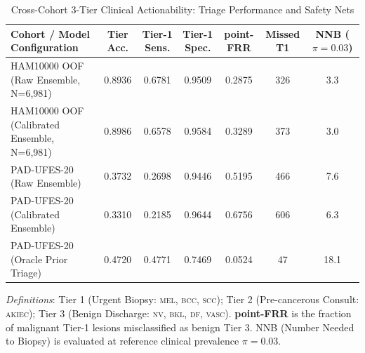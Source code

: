 \begin{table}[t]
\caption{Cross-Cohort 3-Tier Clinical Actionability: Triage Performance and Safety Nets}
\label{tab:clinical_triage}
\centering
\footnotesize
\begin{tabular}{lcccccc}
\toprule
\textbf{Cohort / Model Configuration} & \textbf{Tier Acc.} & \textbf{Tier-1 Sens.} & \textbf{Tier-1 Spec.} & \textbf{point-FRR} & \textbf{Missed T1} & \textbf{NNB} ($\pi=0.03$) \\
\midrule
HAM10000 OOF (Raw Ensemble, N=6,981) & 0.8936 & 0.6781 & 0.9509 & 0.2875 & 326 & 3.3 \\
HAM10000 OOF (Calibrated Ensemble, N=6,981) & 0.8986 & 0.6578 & 0.9584 & 0.3289 & 373 & 3.0 \\
PAD-UFES-20 (Raw Ensemble) & 0.3732 & 0.2698 & 0.9446 & 0.5195 & 466 & 7.6 \\
PAD-UFES-20 (Calibrated Ensemble) & 0.3310 & 0.2185 & 0.9644 & 0.6756 & 606 & 6.3 \\
PAD-UFES-20 (Oracle Prior Triage) & 0.4720 & 0.4771 & 0.7469 & 0.0524 & 47 & 18.1 \\
\bottomrule
\end{tabular}
\vspace{1mm}
\parbox{\linewidth}{\raggedright \emph{Definitions}: Tier 1 (Urgent Biopsy: \textsc{mel}, \textsc{bcc}, \textsc{scc}); Tier 2 (Pre-cancerous Consult: \textsc{akiec}); Tier 3 (Benign Discharge: \textsc{nv}, \textsc{bkl}, \textsc{df}, \textsc{vasc}). \textbf{point-FRR} is the fraction of malignant Tier-1 lesions misclassified as benign Tier 3. NNB (Number Needed to Biopsy) is evaluated at reference clinical prevalence $\pi=0.03$.}
\end{table}